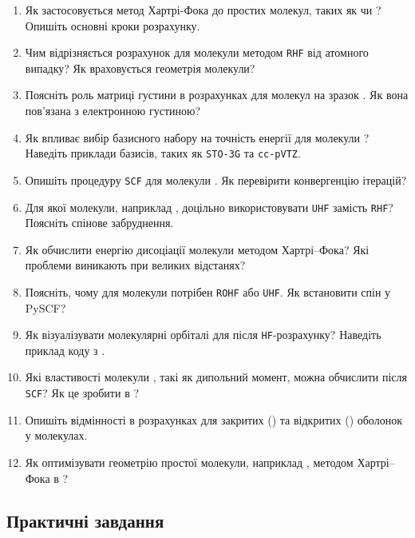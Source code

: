 \begin{enumerate}
	\item Як застосовується метод Хартрі-Фока до простих молекул, таких як  чи ? Опишіть основні кроки розрахунку.
	\item Чим відрізняється розрахунок для молекули  методом \texttt{RHF} від атомного випадку? Як враховується геометрія молекули?
	\item Поясніть роль матриці густини в розрахунках для молекул на зразок . Як вона пов'язана з електронною густиною?
	\item Як впливає вибір базисного набору на точність енергії для молекули ? Наведіть приклади базисів, таких як \texttt{STO-3G} та \texttt{cc-pVTZ}.
	\item Опишіть процедуру \texttt{SCF} для молекули . Як перевірити конвергенцію ітерацій?
	\item Для якої молекули, наприклад , доцільно використовувати \texttt{UHF} замість \texttt{RHF}? Поясніть спінове забруднення.
	\item Як обчислити енергію дисоціації молекули  методом Хартрі--Фока? Які проблеми виникають при великих відстанях?
	\item Поясніть, чому для молекули  потрібен \texttt{ROHF} або \texttt{UHF}. Як встановити спін у PySCF?
	\item Як візуалізувати молекулярні орбіталі для  після \texttt{HF}-розрахунку? Наведіть приклад коду з .
	\item Які властивості молекули , такі як дипольний момент, можна обчислити після \texttt{SCF}? Як це зробити в \PySCF?
	\item Опишіть відмінності в розрахунках для закритих () та відкритих () оболонок у молекулах.
	\item Як оптимізувати геометрію простої молекули, наприклад , методом Хартрі--Фока в \PySCF?
\end{enumerate}

\subsection*{Практичні завдання}

